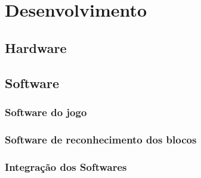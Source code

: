 \chapter{Desenvolvimento} \label{cap:desenvolvimento}

\section{Hardware}

\section{Software}

    \subsection{Software do jogo}
    
    \subsection{Software de reconhecimento dos blocos}
    
    \subsection{Integração dos Softwares}
    